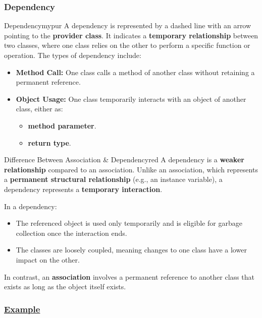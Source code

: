 \subsubsection*{Dependency}

\begin{prettyBox}{Dependency}{mypur}
A dependency is represented by a dashed line with an arrow pointing to the \textbf{provider class}. It indicates a \textbf{temporary relationship} between two classes, where one class relies on the other to perform a specific function or operation. The types of dependency include:
\begin{itemize}
    \item \textbf{Method Call:} One class calls a method of another class without retaining a permanent reference.
    \item \textbf{Object Usage:} One class temporarily interacts with an object of another class, either as:
    \begin{itemize}
        \item \textbf{method parameter}.
        \item \textbf{return type}.
    \end{itemize}
\end{itemize}
\end{prettyBox}

\begin{prettyBox}{Difference Between Association \& Dependency}{red}
A dependency is a \textbf{weaker relationship} compared to an association. Unlike an association, which represents a \textbf{permanent structural relationship} (e.g., an instance variable), a dependency represents a \textbf{temporary interaction}. 

In a dependency:
\begin{itemize}
    \item The referenced object is used only temporarily and is eligible for garbage collection once the interaction ends.
    \item The classes are loosely coupled, meaning changes to one class have a lower impact on the other.
\end{itemize}

In contrast, an \textbf{association} involves a permanent reference to another class that exists as long as the object itself exists.
\end{prettyBox}

\subsubsection*{\underline{Example}}

